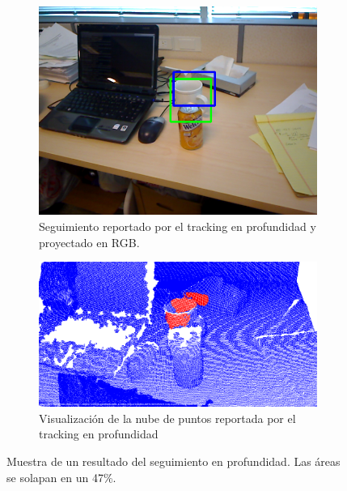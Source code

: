 \begin{figure}
	\centering
	\begin{subfigure}[b]{0.9\textwidth}
		\includegraphics[width=\textwidth]{img/frame_98_taza_rgb.png}
		\caption{Seguimiento reportado por el tracking en profundidad y proyectado en RGB.}
		\label{taza_ocluida_rgb}
	\end{subfigure}
	\quad
	\begin{subfigure}[b]{0.9\textwidth}
		\includegraphics[width=\textwidth]{img/frame_98_taza_pcd.png}
		\caption{Visualización de la nube de puntos reportada por el tracking en profundidad}
		\label{taza_ocluida_pcd}
	\end{subfigure}
	\caption{Muestra de un resultado del seguimiento en profundidad. Las áreas se solapan en un 47\%.}
	\label{taza_ocluida}
\end{figure}


